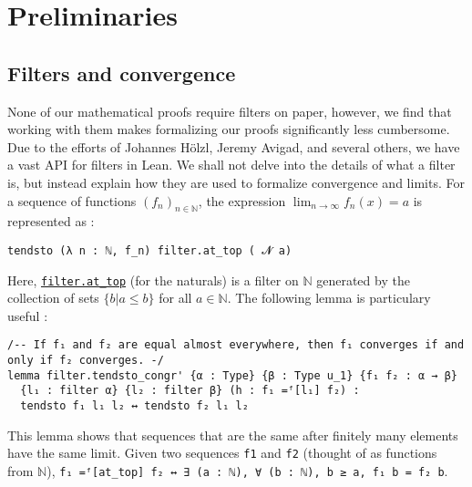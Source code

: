 \documentclass[a4paper,UKenglish,cleveref, autoref, thm-restate]{lipics-v2021}
\newcommand{\lean}[1]{\texttt{#1}\xspace} %
\begin{document}
\section{Preliminaries}
\label{section2}
\subsection{Filters and convergence}
None of our mathematical proofs require filters on paper, however, we find that working with them makes 
formalizing our proofs significantly less cumbersome. Due to the efforts of 
Johannes Hölzl, Jeremy Avigad, and several others, we have a vast API for filters in Lean. 
We shall not delve into the details of what a filter is, but instead explain how they are used to formalize convergence and limits. 
\newline For a sequence of functions $(f_n)_{n \in \mathbb{N}}$, the expression $\lim_{n \to \infty} f_n(x) = a$ is 
represented as :
\begin{lstlisting}
tendsto (λ n : ℕ, f_n) filter.at_top ( 𝓝 a)
\end{lstlisting}
Here, \href{https://leanprover-community.github.io/mathlib_docs/order/filter/at_top_bot.html#filter.at_top}{\lean{filter.at\_top}} 
(for the naturals) is a filter on $\mathbb{N}$ generated by the collection of sets $\{ b | a \leq b \}$ 
for all $a \in \mathbb{N}$. %
The following lemma is particulary useful :
\begin{lstlisting}
/-- If f₁ and f₂ are equal almost everywhere, then f₁ converges if and only if f₂ converges. -/
lemma filter.tendsto_congr' {α : Type} {β : Type u_1} {f₁ f₂ : α → β} 
  {l₁ : filter α} {l₂ : filter β} (h : f₁ =ᶠ[l₁] f₂) : 
  tendsto f₁ l₁ l₂ ↔ tendsto f₂ l₁ l₂
\end{lstlisting}
This lemma shows that sequences that are the same after finitely many 
elements have the same limit. 
Given two sequences \lean{f1} and \lean{f2} (thought of as functions from $\mathbb{N}$), \newline \lean{f₁ =ᶠ[at\_top] f₂ ↔ ∃ (a : ℕ), ∀ (b : ℕ), b ≥ a, f₁ b = f₂ b}. 
\end{document}
